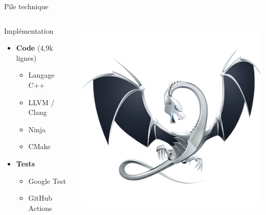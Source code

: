 \begin{frame}{Pile technique}
\begin{columns}
    \begin{column}{0.5\textwidth}
        Implémentation
        \begin{itemize}
            \item \textbf{Code} (4,9k lignes)
            \begin{itemize}
                \item Langage C++
                \item LLVM / Clang
                \item Ninja
                \item CMake
            \end{itemize}
            \item \textbf{Tests}
            \begin{itemize}
                \item Google Test
                \item GitHub Actions
            \end{itemize}
        \end{itemize}
    \end{column}
    \begin{column}{0.5\textwidth}
        \begin{center}
            
            \includegraphics[width=.4\textwidth]{./images/llvm-logo.png}


\end{center}
\end{column}
\end{columns}
\end{frame}
